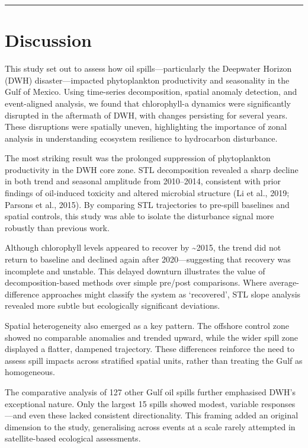 \documentclass[
  11pt,
]{article}
\begin{document}
\begin{center}\rule{0.5\linewidth}{0.5pt}\end{center}

\section{Discussion}\label{discussion}

This study set out to assess how oil spills---particularly the Deepwater
Horizon (DWH) disaster---impacted phytoplankton productivity and
seasonality in the Gulf of Mexico. Using time-series decomposition,
spatial anomaly detection, and event-aligned analysis, we found that
chlorophyll-a dynamics were significantly disrupted in the aftermath of
DWH, with changes persisting for several years. These disruptions were
spatially uneven, highlighting the importance of zonal analysis in
understanding ecosystem resilience to hydrocarbon disturbance.

The most striking result was the prolonged suppression of phytoplankton
productivity in the DWH core zone. STL decomposition revealed a sharp
decline in both trend and seasonal amplitude from 2010--2014, consistent
with prior findings of oil-induced toxicity and altered microbial
structure (Li et al., 2019; Parsons et al., 2015). By comparing STL
trajectories to pre-spill baselines and spatial controls, this study was
able to isolate the disturbance signal more robustly than previous work.

Although chlorophyll levels appeared to recover by \textasciitilde2015,
the trend did not return to baseline and declined again after
2020---suggesting that recovery was incomplete and unstable. This
delayed downturn illustrates the value of decomposition-based methods
over simple pre/post comparisons. Where average-difference approaches
might classify the system as `recovered', STL slope analysis revealed
more subtle but ecologically significant deviations.

Spatial heterogeneity also emerged as a key pattern. The offshore
control zone showed no comparable anomalies and trended upward, while
the wider spill zone displayed a flatter, dampened trajectory. These
differences reinforce the need to assess spill impacts across stratified
spatial units, rather than treating the Gulf as homogeneous.

The comparative analysis of 127 other Gulf oil spills further emphasised
DWH's exceptional nature. Only the largest 15 spills showed modest,
variable responses---and even these lacked consistent directionality.
This framing added an original dimension to the study, generalising
across events at a scale rarely attempted in satellite-based ecological
assessments.
\end{document}

